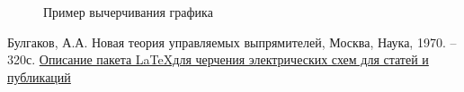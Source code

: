 \begin{figure}[ht!]
\centering
{}
	\caption{Пример вычерчивания графика}
\end{figure}

\renewcommand{\bibname}{}
\begin{thebibliography}{2}
	 Булгаков, А.А. Новая теория управляемых выпрямителей, Москва, Наука, 1970. -- 320с.
         \href{http://texdoc.net/texmf-dist/doc/latex/circuitikz/circuitikzmanual.pdf}{Описание пакета \LaTeX для черчения электрических схем для статей и публикаций}
\end{thebibliography}


